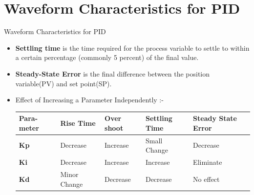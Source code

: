 \documentclass[10pt, a4paper]{beamer}
\begin{document}
		\section{Waveform Characteristics for PID}
		\begin{frame}{Waveform Characteristics for PID} 
			\begin{itemize}
				\item \textbf{Settling time} is the time required for the process variable
				to settle to within a certain percentage (commonly 5 percent) of the final value.
				\item \textbf{Steady-State Error} is the final difference between the position variable(PV) and set point(SP).
				\item Effect of Increasing a Parameter Independently :-
				\begin{table}
					\begin{tabular}{||p{1 cm}|p{1.2 cm}|p{1.2 cm}|p{2 cm}|p{1.5 cm}||}
						\hline
						\textbf{Para- meter} & \textbf{Rise Time} & \textbf{Over shoot} & \textbf{Settling Time} & \textbf{Steady State Error} \\
						\hline
						\textbf{Kp} & Decrease & Increase & Small Change & Decrease \\
						\hline
						\textbf{Ki} & Decrease & Increase & Increase & Eliminate \\
						\hline
						\textbf{Kd} & Minor Change & Decrease & Decrease & No effect \\
						\hline
					\end{tabular}
				\end{table}
			\end{itemize}	 
		\end{frame}
	
\end{document}
